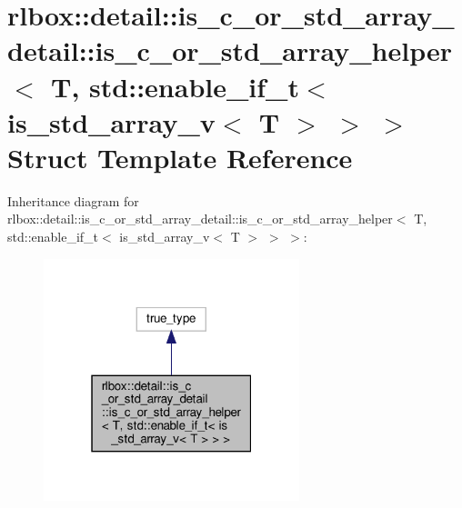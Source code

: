 \hypertarget{structrlbox_1_1detail_1_1is__c__or__std__array__detail_1_1is__c__or__std__array__helper_3_01T_00f7133443f751f75ceb0fc3a4cd3f63ff}{}\section{rlbox\+:\+:detail\+:\+:is\+\_\+c\+\_\+or\+\_\+std\+\_\+array\+\_\+detail\+:\+:is\+\_\+c\+\_\+or\+\_\+std\+\_\+array\+\_\+helper$<$ T, std\+:\+:enable\+\_\+if\+\_\+t$<$ is\+\_\+std\+\_\+array\+\_\+v$<$ T $>$ $>$ $>$ Struct Template Reference}
\label{structrlbox_1_1detail_1_1is__c__or__std__array__detail_1_1is__c__or__std__array__helper_3_01T_00f7133443f751f75ceb0fc3a4cd3f63ff}


Inheritance diagram for rlbox\+:\+:detail\+:\+:is\+\_\+c\+\_\+or\+\_\+std\+\_\+array\+\_\+detail\+:\+:is\+\_\+c\+\_\+or\+\_\+std\+\_\+array\+\_\+helper$<$ T, std\+:\+:enable\+\_\+if\+\_\+t$<$ is\+\_\+std\+\_\+array\+\_\+v$<$ T $>$ $>$ $>$\+:
\nopagebreak
\begin{figure}[H]
\begin{center}
\leavevmode
\includegraphics[width=211pt]{structrlbox_1_1detail_1_1is__c__or__std__array__detail_1_1is__c__or__std__array__helper_3_01T_00c572c4621f526c0df5dd6d2916a8cafa}
\end{center}
\end{figure}


